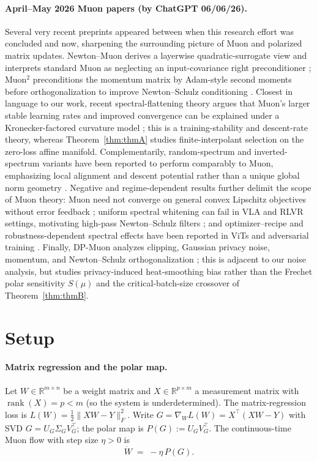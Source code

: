 \documentclass{article}
\begin{document}
\paragraph{April--May 2026 Muon papers (by ChatGPT 06/06/26).}
Several very recent preprints appeared between when this research effort was concluded and now,
sharpening the surrounding picture of Muon and polarized matrix updates. Newton--Muon derives
a layerwise quadratic-surrogate view and interprets standard Muon as neglecting an input-covariance
right preconditioner \citep{du2026newtonmuon}; Muon$^2$ preconditions the momentum matrix by
Adam-style second moments before orthogonalization to improve Newton--Schulz conditioning
\citep{liu2026muon2}. Closest in language to our work, recent spectral-flattening theory argues
that Muon's larger stable learning rates and improved convergence can be explained under a
Kronecker-factored curvature model \citep{nguyen2026spectralflattening}; this is a training-stability
and descent-rate theory, whereas Theorem~\ref{thm:thmA} studies finite-interpolant selection on the
zero-loss affine manifold. Complementarily, random-spectrum and inverted-spectrum variants have
been reported to perform comparably to Muon, emphasizing local alignment and descent potential
rather than a unique global norm geometry \citep{shumaylov2026muonnotthat}. Negative and
regime-dependent results further delimit the scope of Muon theory: Muon need not converge on
general convex Lipschitz objectives without error feedback \citep{parshakova2026muonconvex};
uniform spectral whitening can fail in VLA and RLVR settings, motivating high-pass Newton--Schulz
filters \citep{fan2026pion}; and optimizer--recipe and robustness-dependent spectral effects have
been reported in ViTs and adversarial training \citep{southworth2026muonvit,yan2026adversarialmuon}.
Finally, DP-Muon analyzes clipping, Gaussian privacy noise, momentum, and Newton--Schulz
orthogonalization \citep{kim2026dpmuon}; this is adjacent to our noise analysis, but studies
privacy-induced heat-smoothing bias rather than the Frechet polar sensitivity $S(\mu)$ and the
critical-batch-size crossover of Theorem~\ref{thm:thmB}.
\section{Setup}
\label{sec:setup}

\paragraph{Matrix regression and the polar map.}
Let $W\in\mathbb{R}^{m\times n}$ be a weight matrix and $X\in\mathbb{R}^{p\times m}$ a measurement matrix with $\operatorname{rank}(X)=p<m$ (so the system is underdetermined). The matrix-regression loss is $L(W)=\tfrac{1}{2}\|XW-Y\|_F^2$. Write $G=\nabla_W L(W)=X^\top(XW-Y)$ with SVD $G=U_G\Sigma_G V_G^\top$; the polar map is $P(G):=U_G V_G^\top$. The continuous-time Muon flow with step size $\eta>0$ is
\begin{equation}
\dot W \;=\; -\eta\,P(G).
\label{eq:muon_continuous}
\end{equation}
\end{document}
